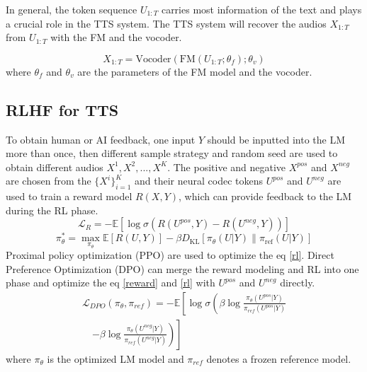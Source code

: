 \documentclass[a4paper]{article}
\begin{document}
In general, the token sequence $U_{1:T}$ carries most information of the text and plays a crucial role in the TTS system. The TTS system will recover the audios $X_{1:T}$ from $U_{1:T}$ with the FM and the vocoder.

\begin{equation}
X_{1:T} = \text{Vocoder}(\text{FM}(U_{1:T}; \theta_{f}); \theta_{v})
\end{equation}
where $\theta_{f}$ and $\theta_{v}$ are the parameters of the FM model and the vocoder.


\subsection{RLHF for TTS}
To obtain human or AI feedback, one input $Y$ should be inputted into the LM more than once, then different sample strategy and random seed are used to obtain different audios ${X^1,  X^2,...,X^K}$. The positive and negative $X^{pos}$ and $X^{neg}$ are chosen from the $\{X^i\}_{i=1}^K$ and their neural codec tokens $U^{pos}$ and $U^{neg}$ 
are used to train a reward model $R(X, Y)$, which can provide feedback to the LM during the RL phase.
\begin{equation} \label{reward}
    \mathcal{L}_R= -\mathbb{E} \left[ \log \sigma(R(U^{pos}, Y) - R(U^{neg}, Y)) \right]
\end{equation}
\begin{equation} \label{rl}
    \pi_\theta^* = \max_{\pi_\theta} \mathbb{E} \left[ R(U, Y) \right] - \beta D_{\text{KL}} \left[ \pi_\theta(U|Y) \| \pi_{\text{ref}}(U|Y) \right]
\end{equation}
Proximal policy optimization (PPO) \cite{schulman_proximal_2017} are used to optimize the eq \ref{rl}. Direct Preference Optimization (DPO) \cite{rafailov_direct_2023} can merge the reward modeling and RL into one phase and optimize the eq \ref{reward} and \ref{rl} with $U^{pos}$ and $U^{neg}$ directly.
\begin{equation}
\begin{split}
    \mathcal{L}_{DPO}(\pi_\theta, \pi_{ref}) =  -\mathbb{E} \left[\log \sigma \left( \beta \log \frac{\pi_\theta(U^{pos}|Y)}{\pi_{ref}(U^{pos}|Y)} \right. \right. \\ \quad \left. \left. - \beta \log \frac{\pi_\theta(U^{neg}|Y)}{\pi_{ref}(U^{neg}|Y)} \right)\right]
\end{split}
\end{equation}
where $\pi_{\theta}$ is the optimized LM model and $\pi_{ref}$ denotes a frozen reference model.
\end{document}

